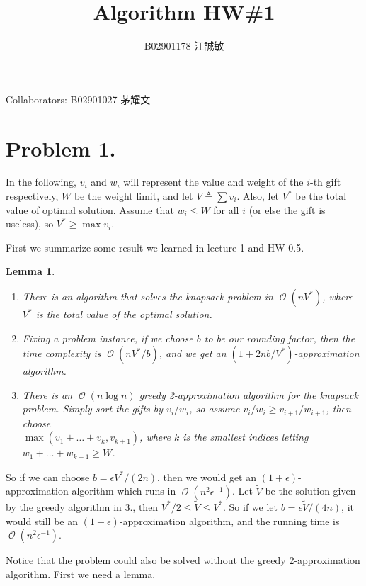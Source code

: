 \documentclass[12pt, a4paper]{article}
\title{Algorithm HW\#1}
\author{B02901178 江誠敏}
\newtheorem{lemma}{Lemma}
\newcommand{\defeq}{\triangleq}
\DeclareMathOperator*{\ord}{\mathcal{O}}
\begin{document}
\maketitle
Collaborators: B02901027 茅耀文
\section{Problem 1.}

In the following, $v_i$ and $w_i$ will represent the value and weight of the $i$-th gift respectively,
$W$ be the weight limit, and let $V \defeq \sum v_i$. Also, let $V^*$ be the total value of optimal solution.
Assume that $w_i \leq W$ for all $i$ (or else the gift is useless), so $V^* \geq \max v_i$.

First we summarize some result we learned in lecture 1 and HW 0.5. \medskip

\begin{lemma} \hfill \label{lemma:recap}
  \begin{enumerate}
    \item There is an algorithm that solves the knapsack problem in $\ord(n V^*)$, where
      $V^*$ is the total value of the optimal solution.
    \item Fixing a problem instance, if we choose $b$ to be our rounding factor,
      then the time complexity is $\ord(n V^* / b)$,
      and we get an $(1 + 2nb / V^*)$-approximation algorithm. \label{lemma:ks-approx-algo}
    \item There is an $\ord(n \log n)$ greedy 2-approximation algorithm for the knapsack problem.
      Simply sort the gifts by $v_i / w_i$, so assume $v_i / w_i \geq v_{i+1} / w_{i+1}$, then choose \\
      $\max(v_1 + \dots + v_k, v_{k+1})$, where $k$ is the smallest indices
      letting $w_1 + \dots + w_{k+1} \geq W$.
  \end{enumerate}
\end{lemma}

So if we can choose $b = \epsilon V^* / (2n)$, then we would get an $(1+\epsilon)$-approximation algorithm
which runs in $\ord(n^2 \epsilon^{-1})$. Let $\tilde{V}$ be the solution given by the greedy algorithm
in 3., then $V^* / 2 \leq \tilde{V} \leq V^*$. So if we let $b = \epsilon
\tilde{V} / (4n)$, it would still be an $(1+\epsilon)$-approximation algorithm, and the running time
is $\ord(n^2 \epsilon^{-1})$.

Notice that the problem could also be solved without the greedy 2-approximation algorithm.
First we need a lemma. \medskip
\end{document}
